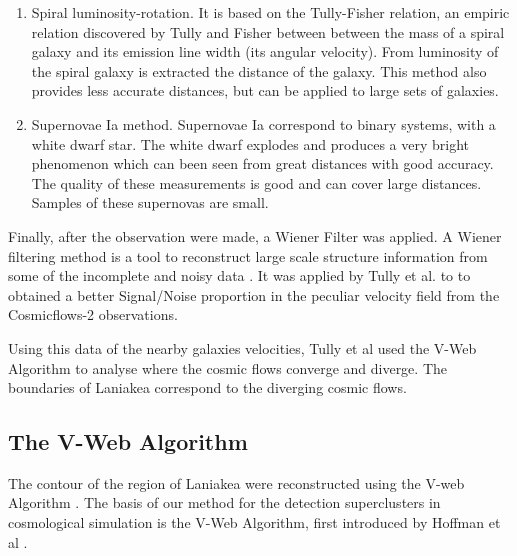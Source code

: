 \documentclass[12pt]{article}
\begin{document}
\begin{par}
\begin{enumerate}
   \item Spiral luminosity-rotation. It is based on
    the Tully-Fisher relation, an empiric relation
     discovered by Tully and
      Fisher \cite{tully_fisher_1977} between between
       the mass of a spiral galaxy and its emission
        line width (its angular velocity). From
         luminosity of the spiral galaxy is extracted
          the distance of the galaxy. This method also
    provides less accurate
  distances, but can be applied to large sets of
   galaxies.\\
   
  \item Supernovae Ia method. Supernovae Ia correspond
   to binary systems, with a white dwarf star. The
    white dwarf explodes and produces a very bright
     phenomenon which can been seen from
 great distances with good accuracy. The quality of
  these measurements is good and can cover large
   distances. Samples of these supernovas
   are small.
   
\end{enumerate}     

\end{par}


\begin{par}
Finally, after the observation were made, a Wiener Filter was applied. A Wiener filtering method is a tool to reconstruct
 large scale structure information from some of the incomplete
  and noisy data \cite{zaroubi_wiener_1995}. It  was
   applied by Tully et al. \cite{tully_laniakea_2014}
    to  to obtained a better Signal/Noise proportion in
     the peculiar velocity field from the Cosmicflows-2 observations.\\
\end{par}

\begin{par}
Using this data of the nearby galaxies velocities, Tully et
 al \cite{tully_laniakea_2014} used the V-Web Algorithm to
  analyse where the cosmic flows converge and diverge. The
   boundaries of Laniakea correspond to the diverging cosmic
    flows.
\end{par}


\subsection{The V-Web Algorithm}
\label{sec:v_web}
The contour of the region of Laniakea were reconstructed
 using the V-web Algorithm \cite{tully_laniakea_2014}.
  The basis of our method for the
  detection superclusters in cosmological simulation is
   the V-Web Algorithm, first introduced by Hoffman et al \cite{hoffman_kinematic_2012}.\\
\end{document}
